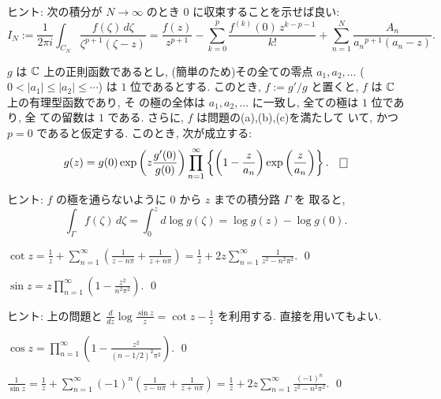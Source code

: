 \documentclass[12pt,twoside]{jarticle}
\begin{document}
\noindent%
ヒント: 次の積分が $N\to\infty$ のとき $0$ に収束することを示せば良い:
\[
  I_N
  :=
  \frac{1}{2\pi i}
  \int_{C_N} \frac{f(\zeta)\,d\zeta}{\zeta^{p+1}(\zeta - z)}
  =
  \frac{f(z)}{z^{p+1}}
  - \sum_{k=0}^p \frac{f^{(k)}(0)\,z^{k-p-1}}{k!} 
  + \sum_{n=1}^N \frac{A_n}{{a_n}^{p+1}(a_n - z)}.
\]

\begin{question}[正則函数の無限乗積展開]\label{q:mugen-joseki-tenkai}
  $g$ は ${\mathbb C}$ 上の正則函数であるとし, %
  (簡単のため)その全ての零点 $a_1, a_2, \dots$ %
  ($0 < |a_1| \le |a_2| \le \cdots$) は $1$ 位であるとする. 
  このとき, $f := g'/g$ と置くと, $f$ は ${\mathbb C}$ 上の有理型函数であり, そ
  の極の全体は $a_1, a_2, \dots$ に一致し, 全ての極は $1$ 位であり, 全
  ての留数は $1$ である. %
  さらに, $f$ は問題の(a),(b),(c)を満たして
  いて, かつ $p=0$ であると仮定する. このとき, 次が成立する:
  \[
    g(z) = g(0)
           \exp\left( z \frac{g'(0)}{g(0)} \right)
           \prod_{n=1}^\infty
             \left\{
               \left( 1 - \frac{z}{a_n} \right)
               \exp\left( \frac{z}{a_n} \right)
             \right\}.
  \qed
  \]
\end{question}

\noindent
ヒント: $f$ の極を通らないように $0$ から $z$ までの積分路 $\Gamma$ を
取ると,
\[
  \int_\Gamma f(\zeta)\,d\zeta
  = \int_0^z d\log g(\zeta)
  = \log g(z) - \log g(0).
\]

\begin{question}
  \(\displaystyle
    \cot z
    =
    \frac{1}{z}
    + \sum_{n=1}^\infty
    \left( \frac{1}{z - n\pi} + \frac{1}{z + n\pi} \right)
    =
    \frac{1}{z}
    + 2 z \sum_{n=1}^\infty \frac{1}{z^2 - n^2\pi^2}.
  \)
  \qed
\end{question}

\begin{question}
  \(\displaystyle
    \sin z =
    z \prod_{n=1}^\infty \left( 1 - \frac{z^2}{n^2\pi^2} \right).
  \)
  \qed
\end{question}

\noindent
ヒント: 上の問題と
\(\displaystyle
  \frac{d}{dz}\log\frac{\sin z}{z} = \cot z - \frac{1}{z}
\)
を利用する. 直接を用いてもよい. 

\begin{question}
  \(\displaystyle
    \cos z =
    \prod_{n=1}^\infty \left( 1 - \frac{z^2}{(n-1/2)^2\pi^2} \right).
  \)
  \qed
\end{question}

\begin{question}
  \(\displaystyle
    \frac{1}{\sin z} 
    =
    \frac{1}{z}
    + \sum_{n=1}^\infty (-1)^n
    \left( \frac{1}{z - n\pi} + \frac{1}{z + n\pi} \right)
    =
    \frac{1}{z}
    + 2 z \sum_{n=1}^\infty \frac{(-1)^n}{z^2 - n^2\pi^2}.
  \)
  \qed
\end{question}
\end{document}
